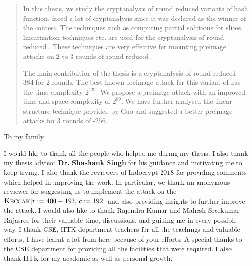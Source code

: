 \begin{abstract}
In this thesis, we study the cryptanalysis of round reduced variants of \KECCAK{} hash function. \KECCAK{} faced a lot of cryptanalysis since it was declared as the winner of the  contest. The techniques such as computing partial solutions for slices,  linearization techniques etc. are used for the cryptanalysis of round-reduced \KECCAK{}. These techniques are very effective for mounting preimage attacks on 2 to 3 rounds of round-reduced \KECCAK{}. 

The main contribution of the thesis is a cryptanalysis of round reduced \KECCAK-$384$ for $2$ rounds. The best known preimage attack for this variant of \KECCAK{} has the time complexity $2^{129}$. We propose a preimage attack with an improved time and space complexity of $2^{89}$. We have further analysed the linear structure technique provided by Guo \etal and suggested a better preimage attacks for 3 rounds of \KECCAK-$256$.
\end{abstract}

\begin{dedication}
To my family
\end{dedication}

\begin{acknowledgments}

I would like to thank all the people who helped me during my thesis. I also thank my thesis advisor \textbf{Dr. Shashank Singh} for his guidance and motivating me to keep trying. I also thank the reviewers of Indocrypt-$2018$ for providing comments which helped in improving the work. In particular, we thank an anonymous reviewer for suggesting us to implement the attack on the $\mbox{\textsc{Keccak}}[r:=400-192,\, c:=192]$ and also providing insights to further improve the attack. I would also like to thank Rajendra Kumar and Mahesh Sreekumar Rajasree for their valuable time, discussions, and guiding me in every possible way. I thank CSE, IITK department teachers for all the teachings and valuable efforts, I have learnt a lot from here because of your efforts. A special thanks to the CSE department for providing all the facilities that were required. I also thank IITK for my academic as well as personal growth.
\end{acknowledgments}

\tableofcontents
\listoftables

\cleardoublepage
{} \label{listoffig}
\listoffigures

\cleardoublepage{} %
